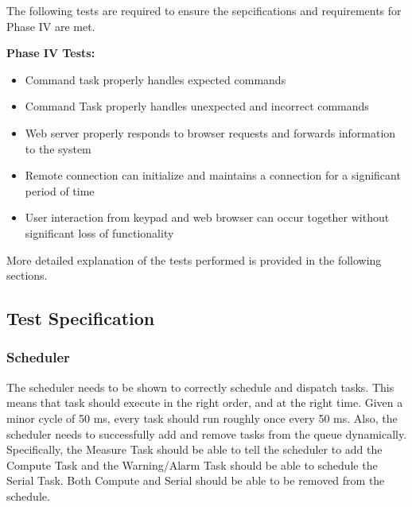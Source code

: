 \documentclass[12pt]{article} %
\begin{document}
		The following tests are required to ensure the sepcifications and
		requirements for Phase IV are met.

		\textbf{Phase IV Tests:}
		\begin{itemize}
			\item Command task properly handles expected commands
			\item Command Task properly handles unexpected and incorrect commands
			\item Web server properly responds to browser requests and forwards information to the system
			\item Remote connection can initialize and maintains a connection for a significant period of time
			\item User interaction from keypad and web browser can occur together without significant loss of functionality
		\end{itemize}
    More detailed explanation of the tests performed is provided in the
    following sections.
    
    \subsection{Test Specification} 

%

    \subsubsection{Scheduler}
    The scheduler needs to be shown to correctly schedule and dispatch tasks.
    This means that task should execute in the right order, and at the right
    time. Given a minor cycle of 50 ms, every task should run roughly once
    every 50 ms.   Also, the scheduler needs to successfully add and remove
    tasks from the queue dynamically.  Specifically, the Measure Task
    should be able to tell the scheduler to add the Compute Task and the
    Warning/Alarm Task should be able to schedule the Serial Task.  Both
    Compute and Serial should be able to be removed from the schedule.
\end{document}
